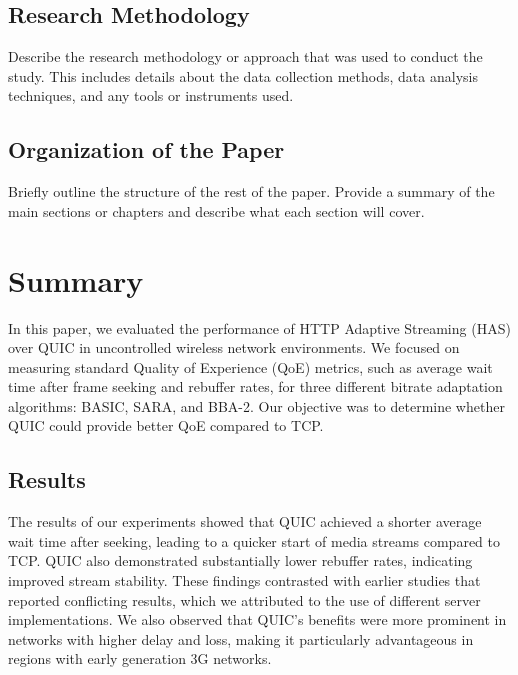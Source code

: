 \documentclass{article}
\begin{document}
\subsection{Research Methodology}
Describe the research methodology or approach that was used to conduct the study. This includes details about the data collection methods, data analysis techniques, and any tools or instruments used.

\subsection{Organization of the Paper}
Briefly outline the structure of the rest of the paper. Provide a summary of the main sections or chapters and describe what each section will cover.


\section{Summary}
In this paper, we evaluated the performance of HTTP Adaptive Streaming (HAS) over QUIC in uncontrolled wireless network environments. We focused on measuring standard Quality of Experience (QoE) metrics, such as average wait time after frame seeking and rebuffer rates, for three different bitrate adaptation algorithms: BASIC, SARA, and BBA-2. Our objective was to determine whether QUIC could provide better QoE compared to TCP.

\subsection{Results}
The results of our experiments showed that QUIC achieved a shorter average wait time after seeking, leading to a quicker start of media streams compared to TCP. QUIC also demonstrated substantially lower rebuffer rates, indicating improved stream stability. These findings contrasted with earlier studies that reported conflicting results, which we attributed to the use of different server implementations. We also observed that QUIC's benefits were more prominent in networks with higher delay and loss, making it particularly advantageous in regions with early generation 3G networks.
\end{document}
